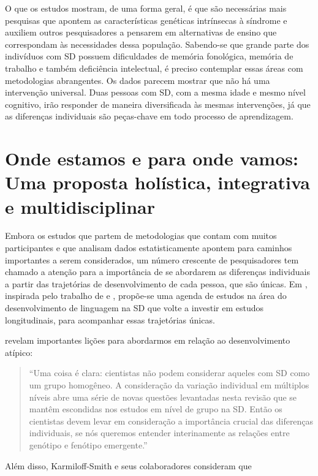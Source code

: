 \documentclass[output=paper,colorlinks,citecolor=brown,booklanguage=portuguese]{langscibook}
\begin{document}
O que os estudos mostram, de uma forma geral, é que são necessárias mais pesquisas que apontem as características genéticas intrínsecas à síndrome e auxiliem outros pesquisadores a pensarem em alternativas de ensino que correspondam às necessidades dessa população. Sabendo-se que grande parte dos indivíduos com SD possuem dificuldades de memória fonológica, memória de trabalho e também deficiência intelectual, é preciso contemplar essas áreas com metodologias abrangentes. Os dados parecem mostrar que não há uma intervenção universal. Duas pessoas com SD, com a mesma idade e mesmo nível cognitivo, irão responder de maneira diversificada às mesmas intervenções, já que as diferenças individuais são peças-chave em todo processo de aprendizagem.

\section{Onde estamos e para onde vamos: Uma proposta holística, integrativa e multidisciplinar}

Embora os estudos que partem de metodologias que contam com muitos participantes e que analisam dados estatisticamente apontem para caminhos importantes a serem considerados, um número crescente de pesquisadores tem chamado a atenção para a importância de se abordarem as diferenças individuais a partir das trajetórias de desenvolvimento de cada pessoa, que são únicas. Em \citet{Lorandi2019}, inspirada pelo trabalho de \citet{KarmiloffSmith1992, KarmiloffSmith1998} e \citet{KarmiloffSmith2010, KarmiloffSmith2012, KarmiloffSmith2016}, propõe-se uma agenda de estudos na área do desenvolvimento de linguagem na SD que volte a investir em estudos longitudinais, para acompanhar essas trajetórias únicas.

\citet[6]{KarmiloffSmith2016} revelam importantes lições para abordarmos em relação ao desenvolvimento atípico:

\begin{quote}
 “Uma coisa é clara: cientistas não podem considerar aqueles com SD como um grupo homogêneo. A consideração da variação individual em múltiplos níveis abre uma série de novas questões levantadas nesta revisão que se mantêm escondidas nos estudos em nível de grupo na SD. Então os cientistas devem levar em consideração a importância crucial das diferenças individuais, se nós queremos entender interinamente as relações entre genótipo e fenótipo emergente.”   
\end{quote}

Além disso, Karmiloff-Smith e seus colaboradores \citep[6]{KarmiloffSmith2016} consideram que
\end{document}

